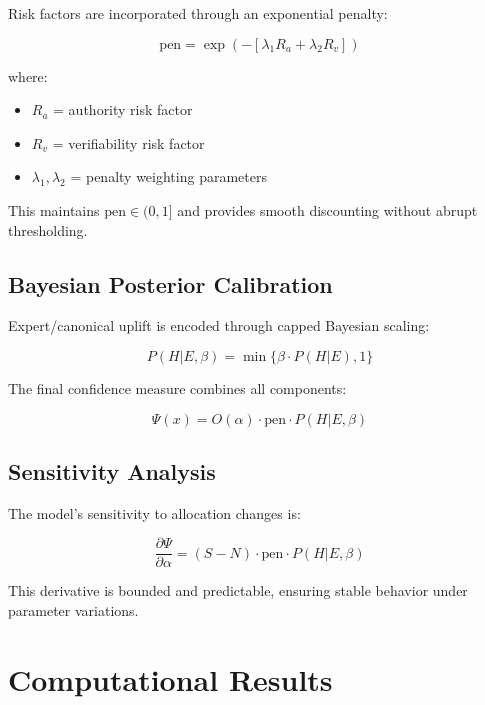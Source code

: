 \documentclass[12pt,a4paper]{article}
\begin{document}
Risk factors are incorporated through an exponential penalty:

\begin{equation}
\text{pen} = \exp(-[\lambda_1 R_a + \lambda_2 R_v])
\end{equation}

where:
\begin{itemize}
    \item $R_a$ = authority risk factor
    \item $R_v$ = verifiability risk factor  
    \item $\lambda_1, \lambda_2$ = penalty weighting parameters
\end{itemize}

This maintains $\text{pen} \in (0,1]$ and provides smooth discounting without abrupt thresholding.

\subsection{Bayesian Posterior Calibration}

Expert/canonical uplift is encoded through capped Bayesian scaling:

\begin{equation}
P(H|E,\beta) = \min\{\beta \cdot P(H|E), 1\}
\end{equation}

The final confidence measure combines all components:

\begin{equation}
\boxed{\Psi(x) = O(\alpha) \cdot \text{pen} \cdot P(H|E,\beta)}
\end{equation}

\subsection{Sensitivity Analysis}

The model's sensitivity to allocation changes is:

\begin{equation}
\frac{\partial \Psi}{\partial \alpha} = (S - N) \cdot \text{pen} \cdot P(H|E,\beta)
\end{equation}

This derivative is bounded and predictable, ensuring stable behavior under parameter variations.

\section{Computational Results}
\end{document}

